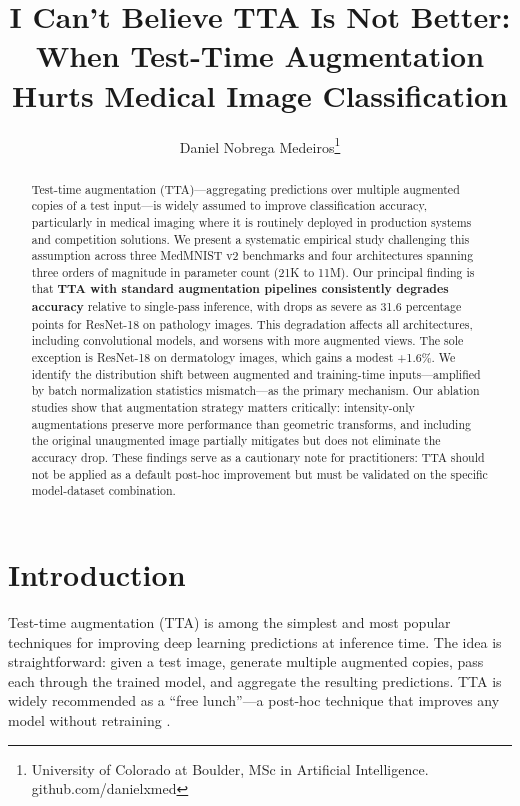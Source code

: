 \documentclass{article}
\title{I Can't Believe TTA Is Not Better: When Test-Time Augmentation Hurts Medical Image Classification}
\author{
Daniel Nobrega Medeiros\thanks{University of Colorado at Boulder, MSc in Artificial Intelligence. github.com/danielxmed}
}
\theoremstyle{plain}
\theoremstyle{definition}
\theoremstyle{remark}
\begin{document}
\maketitle

\begin{abstract}
Test-time augmentation (TTA)---aggregating predictions over multiple augmented copies of a test input---is widely assumed to improve classification accuracy, particularly in medical imaging where it is routinely deployed in production systems and competition solutions. We present a systematic empirical study challenging this assumption across three MedMNIST v2 benchmarks and four architectures spanning three orders of magnitude in parameter count (21K to 11M). Our principal finding is that \textbf{TTA with standard augmentation pipelines consistently degrades accuracy} relative to single-pass inference, with drops as severe as 31.6 percentage points for ResNet-18 on pathology images. This degradation affects all architectures, including convolutional models, and worsens with more augmented views. The sole exception is ResNet-18 on dermatology images, which gains a modest +1.6\%. We identify the distribution shift between augmented and training-time inputs---amplified by batch normalization statistics mismatch---as the primary mechanism. Our ablation studies show that augmentation strategy matters critically: intensity-only augmentations preserve more performance than geometric transforms, and including the original unaugmented image partially mitigates but does not eliminate the accuracy drop. These findings serve as a cautionary note for practitioners: TTA should not be applied as a default post-hoc improvement but must be validated on the specific model-dataset combination.
\end{abstract}

\section{Introduction}
\label{sec:intro}

Test-time augmentation (TTA) is among the simplest and most popular techniques for improving deep learning predictions at inference time. The idea is straightforward: given a test image, generate multiple augmented copies, pass each through the trained model, and aggregate the resulting predictions. TTA is widely recommended as a ``free lunch''---a post-hoc technique that improves any model without retraining \citep{shanmugam2021better, kimura2021understanding}.
\end{document}
